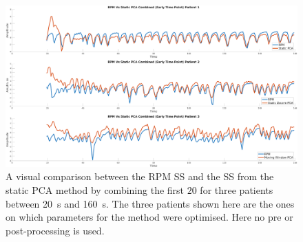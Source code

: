            \begin{figure}
                \centering
                
                \includegraphics[width=1.0\linewidth]{figures/data_driven_surrogate_signal_extraction_results_1_combined_surrogate_signal.png}
                
                \captionsetup{singlelinecheck=false, justification=centering}
                \caption{A visual comparison between the \gls{RPM} \gls{SS} and the \gls{SS} from the static \gls{PCA} method by combining the first $20$  for three patients between \SI{20}{\second} and \SI{160}{\second}. The three patients shown here are the ones on which parameters for the method were optimised. Here no pre or post-processing is used.}
                \label{fig:pca_data_driven_surrogate_signal_extraction_methods_for_dynamic_pet_results_combined_surrogate_signal}
            \end{figure}
            
